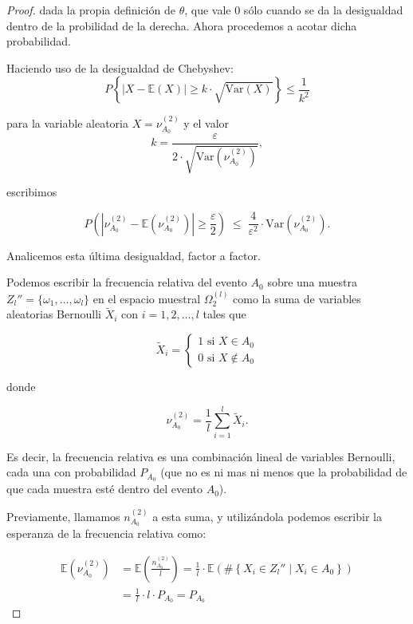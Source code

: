 \documentclass{report}
\begin{document}
\begin{proof}
dada la propia definición de $\theta$, que vale $0$ sólo cuando se da la desigualdad dentro de la probilidad de la derecha. Ahora procedemos a acotar dicha probabilidad.\newline

Haciendo uso de la desigualdad de Chebyshev: 
\[
P\left\{|X- \mathbb{E}\left(X \right)| \geq k \cdot \sqrt{\text{Var}(X)} \right\} \leq \frac{1}{k^2}
\]

para la variable aleatoria $X=\nu_{A_0}^{(2)}$ y el valor
\[
k= \frac{\varepsilon}{2\cdot\sqrt{\text{Var}\left(\nu_{A_0}^{(2)}\right)}}   ,
\]

escribimos

\begin{equation}
P\left(|\nu_{A_0}^{(2)} - \mathbb{E}\left(\nu_{A_0}^{(2)} \right)| \geq \frac{\varepsilon}{2}\right) 
\;\leq\; \frac{4}{\varepsilon^2}\cdot \text{Var}\left(\nu_{A_0}^{(2)}\right). \label{Chebyshev aplicada a frecuencia relativa}
\end{equation}
\bigskip

Analicemos esta última desigualdad, factor a factor.\newline

Podemos escribir la frecuencia relativa del evento $A_0$ sobre una muestra $Z_l''=\{\omega_1,\ldots,\omega_l\}$ en el espacio muestral $\Omega^{(l)}_2$ como la suma de variables aleatorias
Bernoulli $\tilde{X}_i$ con $i=1,2,\dots,l$ tales que

\[
    \tilde{X}_i = \begin{cases} 1 \text{ si } X\in A_0\\
        0 \text{ si } X\notin A_0
\end{cases}
\]

donde

\[
    \nu_{A_0}^{(2)} = \frac{1}{l}\sum_{i=1}^l \tilde{X}_i.
\]

Es decir, la frecuencia relativa es una combinación lineal de variables Bernoulli, cada una con probabilidad $P_{A_0}$ (que no es ni mas ni
menos que la probabilidad de que cada muestra esté dentro del evento $A_0$).\newline

Previamente, llamamos $n_{A_0}^{(2)}$ a esta suma, y utilizándola podemos escribir la esperanza de la frecuencia relativa como:

\[
\begin{aligned}
    \mathbb{E}\left(\nu_{A_0}^{(2)} \right) &= \mathbb{E}\left(\frac{n_{A_0}^{(2)}}{l} \right) =  \frac{1}{l} \cdot \mathbb{E}\left( \#\left\{X_i\in Z_l''\mid X_i\in A_0\right\}\right)\\
    &= \frac{1}{l} \cdot l \cdot P_{A_0} = P_{A_0}
\end{aligned}
\]


\end{proof}
\end{document}

